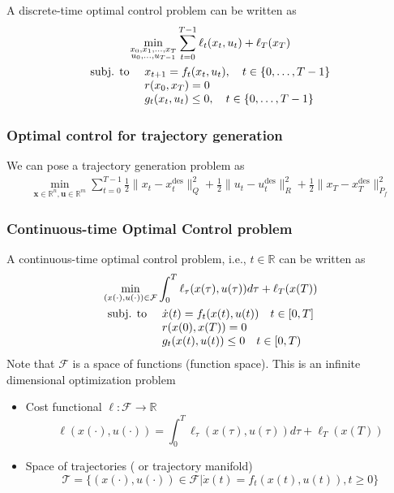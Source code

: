 \documentclass{book}
\DeclareMathOperator{\des}{des}
\newcommand{\R}{\mathbb{R}}
\theoremstyle{definition}
\theoremstyle{remark}
\theoremstyle{remark}
\begin{document}
A discrete-time optimal control problem can be written as 
\begin{gather*}
    \min_{\substack{x_0,x_1,\dots,x_T\\u_0,\dots,u_{T-1}}} \displaystyle\sum_{t=0}^{T-1}\ell_t(x_t,u_t)+\ell_T(x_T)\\
    \begin{array}{l l }
        \text{subj. to } & x_{t+1}=f_t(x_t,u_t), \quad t\in\{0,\dots,T-1\}\\
                         & r(x_0,x_T) = 0  \\
                         & g_t(x_t,u_t)\leq 0, \quad t\in\{0,\dots,T-1\}
    \end{array}
\end{gather*}

\subsubsection{Optimal control for trajectory generation}
We can pose a trajectory generation problem as 
\begin{gather*}
    \min_{\mathbf{x}\in\R^n,\mathbf{u}\in\R^m}\displaystyle\sum_{t=0}^{T-1}\displaystyle\frac{1}{2}\|x_t-x_t^{\des}\|^2_Q + \displaystyle\frac{1}{2}\|u_t-u_t^{\des}\|^2_R + \displaystyle\frac{1}{2}\|x_T-x_T^{\des}\|^2_{P_f}
\end{gather*}

\subsubsection{Continuous-time Optimal Control problem}
A continuous-time optimal control problem, i.e., $t\in\R$ can be written as 
\begin{gather*}
    \min_{(x(\cdot),u(\cdot))\in \mathcal{F}}\displaystyle\int_{0}^{T}\ell_\tau(x(\tau),u(\tau))d\tau+\ell_T(x(T))\\
    \begin{array}{l l}
        \text{subj. to } & \dot{x}(t) = f_t(x(t),u(t)) \quad t\in[0,T]\\
                         & r(x(0),x(T)) = 0 \\
                         & g_t(x(t),u(t))\leq 0 \quad t\in[0,T)
    \end{array}
\end{gather*}
Note that $\mathcal{F}$ is a space of functions (function space). This is an infinite dimensional optimization problem
\begin{itemize}
    \item Cost functional $\ell:\mathcal{F}\to\R$
        \[
            \ell(x(\cdot),u(\cdot)) = \displaystyle\int_{0}^{T}\ell_\tau(x(\tau),u(\tau))d\tau+\ell_T(x(T))
        \]
    \item Space of trajectories ( or trajectory manifold)
        \[
            \mathcal{T} = \{(x(\cdot),u(\cdot))\in\mathcal{F}|\dot{x}(t)=f_t(x(t),u(t)), t\geq 0\}
        \]
\end{itemize}
\end{document}
